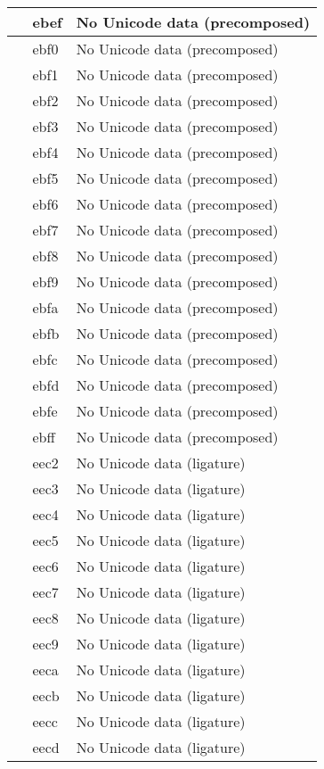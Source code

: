 \documentclass[12pt,letterpaper,openany]{book}
\begin{document}
\begin{center}
\begin{supertabular}{|m{0.25in}|m{0.5in}|m{4in}|}
			 & ebef & No Unicode data (precomposed)\\\hline
			 & ebf0 & No Unicode data (precomposed)\\\hline
			 & ebf1 & No Unicode data (precomposed)\\\hline
			 & ebf2 & No Unicode data (precomposed)\\\hline
			 & ebf3 & No Unicode data (precomposed)\\\hline
			 & ebf4 & No Unicode data (precomposed)\\\hline
			 & ebf5 & No Unicode data (precomposed)\\\hline
			 & ebf6 & No Unicode data (precomposed)\\\hline
			 & ebf7 & No Unicode data (precomposed)\\\hline
			 & ebf8 & No Unicode data (precomposed)\\\hline
			 & ebf9 & No Unicode data (precomposed)\\\hline
			 & ebfa & No Unicode data (precomposed)\\\hline
			 & ebfb & No Unicode data (precomposed)\\\hline
			 & ebfc & No Unicode data (precomposed)\\\hline
			 & ebfd & No Unicode data (precomposed)\\\hline
			 & ebfe & No Unicode data (precomposed)\\\hline
			 & ebff & No Unicode data (precomposed)\\\hline
			 & eec2 & No Unicode data (ligature)\\\hline
			 & eec3 & No Unicode data (ligature)\\\hline
			 & eec4 & No Unicode data (ligature)\\\hline
			 & eec5 & No Unicode data (ligature)\\\hline
			 & eec6 & No Unicode data (ligature)\\\hline
			 & eec7 & No Unicode data (ligature)\\\hline
			 & eec8 & No Unicode data (ligature)\\\hline
			 & eec9 & No Unicode data (ligature)\\\hline
			 & eeca & No Unicode data (ligature)\\\hline
			 & eecb & No Unicode data (ligature)\\\hline
			 & eecc & No Unicode data (ligature)\\\hline
			 & eecd & No Unicode data (ligature)\\\hline

\end{supertabular}
\end{center}
\end{document}
